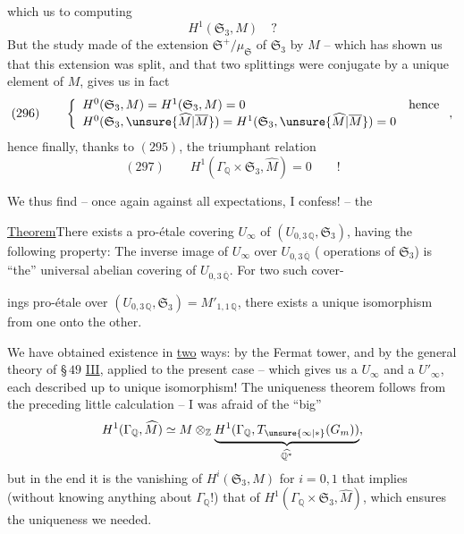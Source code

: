 which  us to computing
\[
H^1(\mathfrak S_3,M)\quad ?
\]
But the study made of the extension $\mathfrak S^+/\mu_{\mathfrak S}$ of $\mathfrak S_3$ by $M$ -- which has shown us that this extension was split, and that two splittings were conjugate by a unique element of $M$, gives us in fact
\[
(296)\qquad
\left\{\begin{array}{ll}
H^0(\mathfrak S_3,M)=H^1(\mathfrak S_3,M)=0&\text{hence}\\
H^0(\mathfrak S_3,\unsure{\widehat M|\overline M})=H^1(\mathfrak S_3,\unsure{\widehat M|\overline M})=0&
\end{array}\right.
,
\]
hence finally, thanks to $(295)$, the triumphant relation
\[
(297)\qquad\boxed{H^1(\Gamma_{\mathbb Q}\times\mathfrak S_3,\widehat M)=0}\qquad !
\]

We thus find -- once again against all expectations, I confess! -- the

\uline{Theorem}\quad There exists a pro-étale covering
 $U_\infty$ of $(U_{0,3\,\mathbb Q},\mathfrak S_3)$, having the following property: The inverse image  of $U_\infty$ over $U_{0,3\,\overline{\mathbb Q}}$ ( operations of $\mathfrak S_3$) is ``the'' universal abelian covering of $U_{0,3\,\overline{\mathbb Q}}$. For two such cover-




ings pro-étale over $(U_{0,3\,\mathbb Q},\mathfrak S_3)=M'_{1,1\,\mathbb Q}$, there exists a unique isomorphism from one onto the other.

We have obtained existence in \uline{two} ways: by the Fermat tower, and by the general theory of \S\,$49$ \uline{III}, applied to the present case -- which gives us a $U_\infty$ and a $U'_\infty$, each described up to unique isomorphism! The uniqueness theorem follows from the preceding little calculation -- I was afraid of the ``big'' 
\[
H^1(\Gamma_{\mathbb Q},\widehat M)\simeq
M\otimes_{\mathbb Z}\underbrace{H^1(\Gamma_{\mathbb Q},T_{\unsure{\infty|*}}(G_m))}_{\widehat{\mathbb Q^{*}}},
\]
but in the end it is the vanishing of $H^{i}(\mathfrak S_3,M)$ for $i=0,1$ that implies (without knowing anything about $\Gamma_{\mathbb Q}$!) that of $H^1(\Gamma_{\mathbb Q}\times\mathfrak S_3,\widehat M)$, which ensures the uniqueness we needed.

